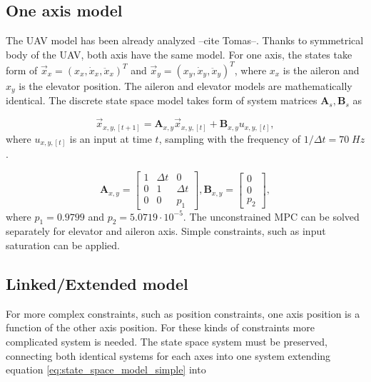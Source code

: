 \documentclass{article}
\begin{document}
\subsection{One axis model}
The UAV model has been already analyzed --cite Tomas--. Thanks to symmetrical body of the UAV, both axis have the same model. For one axis, the states take form of 
$\vec{x}_x = (x_x, \dot{x}_x, \ddot{x}_x)^T$ and $\vec{x}_y = (x_y, \dot{x}_y, \ddot{x}_y)^T$, where $x_x$ is the aileron and $x_y$ is the elevator position. The aileron and elevator models are mathematically identical. The discrete state space model takes form of system matrices $\textbf{A}_s, \textbf{B}_s$ as

\begin{equation}
\label{eq:state_space_model_simple}
\vec{x}_{x,y,[t+1]} = \textbf{A}_{x,y} \vec{x}_{x,y, [t]} +\textbf{B}_{x,y} u_{x,y, [t]},
\end{equation} 
where $u_{x,y,[t]}$ is an input at time $t$, sampling with the frequency of $1/\Delta t = 70\;Hz$.




\begin{equation}
\textbf{A}_{x,y} =
  \begin{bmatrix}
  1 & \Delta t & 		0 \\
  0 & 		 1 & \Delta t \\
  0	& 		 0 &		p_1
  \end{bmatrix},\textbf{B}_{x,y} = \begin{bmatrix}
  0 \\
  0 \\
  p_2
  \end{bmatrix}, 
\end{equation}
where $p_1 = 0.9799$ and $p_2 = 5.0719\cdot10^{-5}$. The unconstrained MPC can be solved separately for elevator and aileron axis. Simple constraints, such as input saturation can be applied.

\subsection{{\color{red} Linked/Extended} model}		%
For more complex constraints, such as position constraints, one axis position is a function of the other axis position. For these kinds of constraints more complicated system is needed. The state space system must be preserved, connecting both identical systems for each axes into one system extending equation \ref{eq:state_space_model_simple} into 
\end{document}
